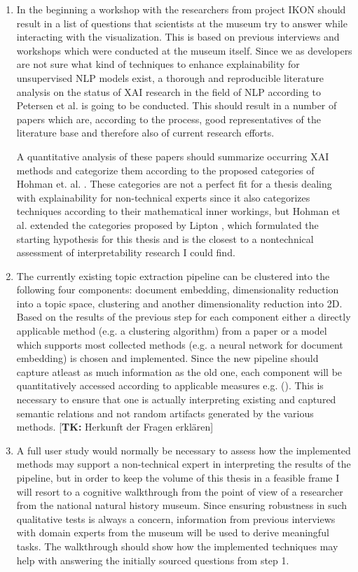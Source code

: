 \documentclass[pdftex,a4paper,12pt]{scrartcl}
\newcommand{\tk}[1]{\textcolor{tim}{[\textbf{TK:} #1]}}
\begin{document}
\begin{enumerate}
	\item In the beginning a workshop with the researchers from project IKON should result in a list of questions that scientists at the museum try to answer while interacting with the visualization. This is based on previous interviews and workshops which were conducted at the museum itself.
	Since we as developers are not sure what kind of techniques to enhance explainability for unsupervised NLP models exist, a thorough and reproducible literature analysis on the status of XAI research in the field of NLP according to Petersen et al. \cite{petersenSystematicMappingStudies2008} is going to be conducted. This should result in a number of papers which are, according to the process, good representatives of the literature base and therefore also of current research efforts. 
	
	A quantitative analysis of these papers should summarize occurring XAI methods and categorize them according to the proposed categories of Hohman et. al. \cite{hohmanGamutDesignProbe2019}. These categories are not a perfect fit for a thesis dealing with explainability for non-technical experts since it also categorizes techniques according to their mathematical inner workings, but Hohman et al. extended the categories proposed by Lipton \cite{liptonMythosModelInterpretability2016a}, which formulated the starting hypothesis for this thesis and is the closest to a nontechnical assessment of interpretability research I could find. 
	
	\item The currently existing topic extraction pipeline can be clustered into the following four components: document embedding, dimensionality reduction into a topic space, clustering and another dimensionality reduction into 2D. Based on the results of the previous step for each component either a directly applicable method (e.g. a clustering algorithm) from a paper or a model which supports most collected methods (e.g. a neural network for document embedding) is chosen and implemented. Since the new pipeline should capture atleast as much information as the old one, each component will be quantitatively accessed according to applicable measures e.g. (\cite{roderExploringSpaceTopic2015a}). This is necessary to ensure that one is actually interpreting existing and captured semantic relations and not random artifacts generated by the various methods. \tk{Herkunft der Fragen erklären}
	
	\item A full user study would normally be necessary to assess how the implemented methods may support a non-technical expert in interpreting the results of the pipeline, but in order to keep the volume of this thesis in a feasible frame I will resort to a cognitive walkthrough from the point of view of a researcher from the national natural history museum.
	Since ensuring robustness in such qualitative tests is always a concern, information from previous interviews with domain experts from the museum will be used to derive meaningful tasks. The walkthrough should show how the implemented techniques may help with answering the initially sourced questions from step 1.
\end{enumerate}
\end{document}
